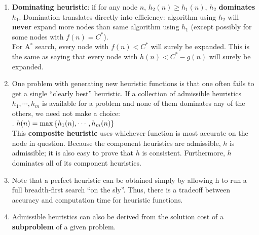 \begin{enumerate}
\begin{enumerate}
        \item \textbf{Dominating heuristic}: if for any node $n$, $h_2(n) \geq h_1(n)$, $h_2$ \textbf{dominates} $h_1$.
        Domination translates directly into efficiency: algorithm using $h_2$ will \textbf{never} expand more nodes than same algorithm using $h_1$
        (except possibly for some nodes with $f(n) = C^\ast$).
        \hfill \cite{ai/book/Artificial-Intelligence-A-Modern-Approach/Russell-Norvig}
        \\
        For A$^\ast$ search, every node with $f(n) < C^\ast$ will surely be expanded.
        This is the same as saying that every node with $h(n) < C^\ast - g(n)$ will surely be expanded.
        \hfill \cite{ai/book/Artificial-Intelligence-A-Modern-Approach/Russell-Norvig}

        \item One problem with generating new heuristic functions is that one often fails to get a single “clearly best” heuristic.
        If a collection of admissible heuristics $h_1, \cdots, h_m$ is available for a problem and none of them dominates any of the others, we need not make a choice:
        \hfill \cite{ai/book/Artificial-Intelligence-A-Modern-Approach/Russell-Norvig}
        \\
        .\hfill
        $h(n) = \max\left\{h_1(n),\cdots,h_m(n)\right\}$
        \hfill \cite{ai/book/Artificial-Intelligence-A-Modern-Approach/Russell-Norvig}
        \\
        This \textbf{composite heuristic} uses whichever function is most accurate on the node in question.
        Because the component heuristics are admissible, $h$ is admissible; it is also easy to prove that $h$ is consistent.
        Furthermore, $h$ dominates all of its component heuristics.
        \hfill \cite{ai/book/Artificial-Intelligence-A-Modern-Approach/Russell-Norvig}

        \item Note that a perfect heuristic can be obtained simply by allowing h to run a full breadth-first search “on the sly”.
        Thus, there is a tradeoff between accuracy and computation time for heuristic functions.
        \hfill \cite{ai/book/Artificial-Intelligence-A-Modern-Approach/Russell-Norvig}

        \item Admissible heuristics can also be derived from the solution cost of a \textbf{subproblem} of a given problem.
        \hfill \cite{ai/book/Artificial-Intelligence-A-Modern-Approach/Russell-Norvig}


\end{enumerate}
\end{enumerate}
